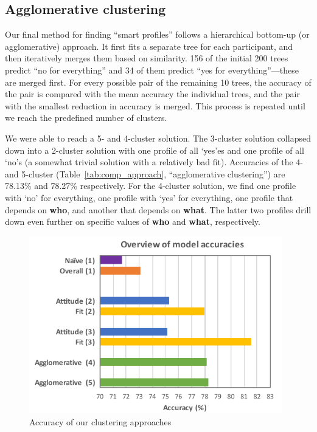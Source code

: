\subsection{Agglomerative clustering}
Our final method for finding ``smart profiles'' follows a hierarchical bottom-up (or agglomerative) approach. It first fits a separate tree for each participant, and then iteratively merges them based on similarity. 156 of the initial 200 trees predict ``no for everything'' and 34 of them predict ``yes for everything''---these are merged first. For every possible pair of the remaining 10 trees, the accuracy of the pair is compared with the mean accuracy the individual trees, and the pair with the smallest reduction in accuracy is merged. This process is repeated until we reach the predefined number of clusters.

We were able to reach a 5- and 4-cluster solution. The 3-cluster solution collapsed down into a 2-cluster solution with one profile of all `yes'es and one profile of all `no's (a somewhat trivial solution with a relatively bad fit). Accuracies of the 4- and 5-cluster (Table~\ref{tab:comp_approach}, ``agglomerative clustering'') are 78.13\% and 78.27\% respectively. For the 4-cluster solution, we find one profile with `no' for everything, one profile with `yes' for everything, one profile that depends on \textbf{who}, and another that depends on \textbf{what}. The latter two profiles drill down even further on specific values of \textbf{who} and \textbf{what}, respectively.



\begin{figure}[t]
	\centering
	\includegraphics[width=0.98\textwidth]{figures/compare.pdf}
	\caption{Accuracy of our clustering approaches}
	\label{fig:comp_approach}
\end{figure}


